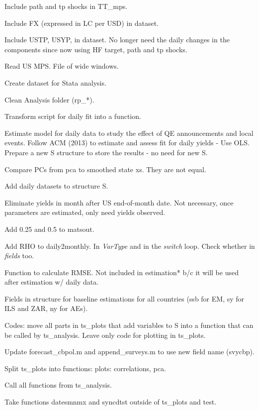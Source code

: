 \documentclass[12pt]{article}
\newcommand{\cmark}{\ding{51}}
\newcommand{\xmark}{\ding{55}}
\newcommand{\done}{\rlap{$\square$}{\raisebox{2pt}{\large\hspace{1pt}\cmark}}%
	\hspace{-2.5pt}}
\newcommand{\wontdo}{\rlap{$\square$}{\large\hspace{1pt}\xmark}}
\begin{document}
\begin{todolist}
	\item[\done] Include path and tp shocks in TT_mps.
	\item[\done] Include FX (expressed in LC per USD) in dataset.
	\item[\wontdo] Include USTP, USYP, in dataset. No longer need the daily changes in the components since now using HF target, path and tp shocks.
	\item[\done] Read US MPS. File of wide windows.
	\item[\done] Create dataset for Stata analysis.
	\item[\done] Clean Analysis folder (rp_*).
	\item[\done] Transform script for daily fit into a function.
	\item[\done] Estimate model for daily data to study the effect of QE announcements and local events. Follow ACM (2013) to estimate and assess fit for daily yields - Use OLS. Prepare a new S structure to store the results - no need for new S.
	\item[\done] Compare PCs from pca to smoothed state xs. They are not equal.
	\item[\done] Add daily datasets to structure S.
	\item[\wontdo] Eliminate yields in month after US end-of-month date. Not necessary, once parameters are estimated, only need yields observed.
	\item[\done] Add 0.25 and 0.5 to matsout.
	\item[\done] Add RHO to daily2monthly. In \textit{VarType} and in the \textit{switch} loop. Check whether in \textit{fields} too.
	\item[\done] Function to calculate RMSE. Not included in estimation* b/c it will be used after estimation w/ daily data.
	\item[\done] Fields in structure for baseline estimations for all countries (ssb for EM, sy for ILS and ZAR, ny for AEs).
	\item[\done] Codes: move all parts in ts_plots that add variables to S into a function that can be called by ts_analysis. Leave only code for plotting in ts_plots.
	\begin{todolist}		
		\item[\done] Update forecast_cbpol.m and append_surveys.m to use new field name (svycbp).
		\item[\done] Split ts_plots into functions: plots: correlations, pca.
		\item[\done] Call all functions from ts_analysis.
		\item[\done] Take functions datesmnmx and syncdtst outside of ts_plots and test.

\end{todolist}
\end{todolist}
\end{document}
